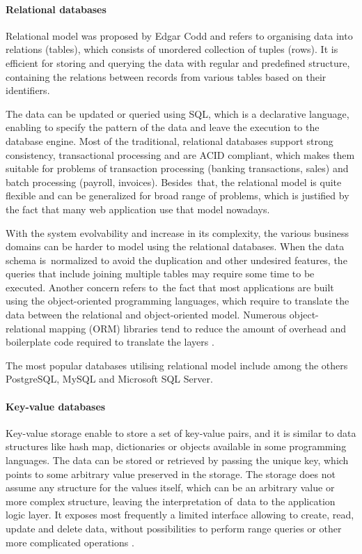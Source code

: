 \paragraph{Relational databases}

Relational model was proposed by Edgar Codd and refers to organising data into relations (tables), which consists of unordered collection of tuples (rows). It is efficient for storing and querying the data with regular and predefined structure, containing the relations between records from various tables based on their identifiers.

The data can be updated or queried using SQL, which is a declarative language, enabling to specify the pattern of the data and leave the execution to the database engine. Most of the traditional, relational databases support strong consistency, transactional processing and are ACID compliant, which makes them suitable for problems of transaction processing (banking transactions, sales) and batch processing (payroll, invoices). Besides~that, the relational model is quite flexible and can be generalized for broad range of problems, which is justified by the fact that many web application use that model nowadays.

With the system evolvability and increase in its complexity, the various business domains can be harder to model using the relational databases. When the data schema is~normalized to avoid the duplication and other undesired features, the queries that include joining multiple tables may require some time to be executed. Another concern refers to~the fact that most applications are built using the object-oriented programming languages, which require to translate the data between the relational and object-oriented model. Numerous object-relational mapping (ORM) libraries tend to reduce the amount of overhead and boilerplate code required to translate the layers \cite{DesignDataIntensiveApplications}.

The most popular databases utilising relational model include among the others PostgreSQL, MySQL and Microsoft SQL Server.

\paragraph{Key-value databases}

Key-value storage enable to store a set of key-value pairs, and it is similar to data structures like hash map, dictionaries or objects available in some programming languages. The data can be stored or retrieved by passing the unique key, which points to some arbitrary value preserved in the storage.
The storage does not assume any structure for the values itself, which can be an arbitrary value or more complex structure, leaving the interpretation of~data to the application logic layer.
It exposes most frequently a limited interface allowing to create, read, update and delete data, without possibilities to perform range queries or other more complicated operations \cite{NoSQLDatabaseSystemsSurveyDecisionGuidance}.


